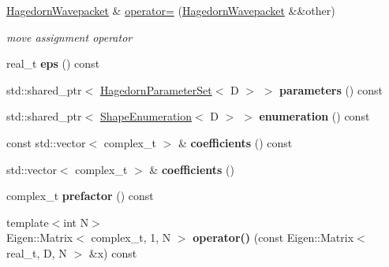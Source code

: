 \begin{DoxyCompactItemize}
\item 
\hyperlink{classwaveblocks_1_1_hagedorn_wavepacket}{Hagedorn\+Wavepacket} \& \hyperlink{classwaveblocks_1_1_hagedorn_wavepacket_af8d5f756b84ed20da5d41fa4a5259fee}{operator=} (\hyperlink{classwaveblocks_1_1_hagedorn_wavepacket}{Hagedorn\+Wavepacket} \&\&other)
\begin{DoxyCompactList}\small\item\em move assignment operator \end{DoxyCompactList}\item 
\hypertarget{classwaveblocks_1_1_hagedorn_wavepacket_a38529a9b7f9b61ae220fef0efe15b0c5}{}real\+\_\+t {\bfseries eps} () const \label{classwaveblocks_1_1_hagedorn_wavepacket_a38529a9b7f9b61ae220fef0efe15b0c5}

\item 
\hypertarget{classwaveblocks_1_1_hagedorn_wavepacket_a981deaa6257381a7c81966dd669b0d4f}{}std\+::shared\+\_\+ptr$<$ \hyperlink{structwaveblocks_1_1_hagedorn_parameter_set}{Hagedorn\+Parameter\+Set}$<$ D $>$ $>$ {\bfseries parameters} () const \label{classwaveblocks_1_1_hagedorn_wavepacket_a981deaa6257381a7c81966dd669b0d4f}

\item 
\hypertarget{classwaveblocks_1_1_hagedorn_wavepacket_ab0b7fcf652bbacce0a8a58abd7574c8f}{}std\+::shared\+\_\+ptr$<$ \hyperlink{classwaveblocks_1_1_shape_enumeration}{Shape\+Enumeration}$<$ D $>$ $>$ {\bfseries enumeration} () const \label{classwaveblocks_1_1_hagedorn_wavepacket_ab0b7fcf652bbacce0a8a58abd7574c8f}

\item 
\hypertarget{classwaveblocks_1_1_hagedorn_wavepacket_a948f4f085c2ede962ede2cf22990eddf}{}const std\+::vector$<$ complex\+\_\+t $>$ \& {\bfseries coefficients} () const \label{classwaveblocks_1_1_hagedorn_wavepacket_a948f4f085c2ede962ede2cf22990eddf}

\item 
\hypertarget{classwaveblocks_1_1_hagedorn_wavepacket_aae6dde6e18cc020a3161070953f12d68}{}std\+::vector$<$ complex\+\_\+t $>$ \& {\bfseries coefficients} ()\label{classwaveblocks_1_1_hagedorn_wavepacket_aae6dde6e18cc020a3161070953f12d68}

\item 
\hypertarget{classwaveblocks_1_1_hagedorn_wavepacket_a0cc73b7ac4561fe8eb7a98f0085f9911}{}complex\+\_\+t {\bfseries prefactor} () const \label{classwaveblocks_1_1_hagedorn_wavepacket_a0cc73b7ac4561fe8eb7a98f0085f9911}

\item 
\hypertarget{classwaveblocks_1_1_hagedorn_wavepacket_acbcac96d757603203e7561750b5abb84}{}{\footnotesize template$<$int N$>$ }\\Eigen\+::\+Matrix$<$ complex\+\_\+t, 1, N $>$ {\bfseries operator()} (const Eigen\+::\+Matrix$<$ real\+\_\+t, D, N $>$ \&x) const \label{classwaveblocks_1_1_hagedorn_wavepacket_acbcac96d757603203e7561750b5abb84}


\end{DoxyCompactItemize}
